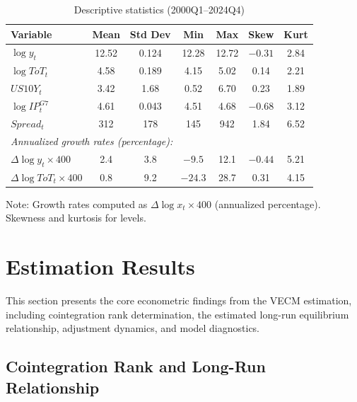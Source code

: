 \documentclass[12pt,a4paper]{article}
\numberwithin{equation}{section}
\theoremstyle{definition}
\theoremstyle{remark}
\begin{document}
\begin{table}[ht]
\centering
\begin{threeparttable}
\caption{Descriptive statistics (2000Q1--2024Q4)}
\label{tab:descriptives}
\begin{tabular}{@{}lcccccc@{}}
\toprule
\textbf{Variable} & \textbf{Mean} & \textbf{Std Dev} & \textbf{Min} & \textbf{Max} & \textbf{Skew} & \textbf{Kurt} \\
\midrule
$\log y_t$ & 12.52 & 0.124 & 12.28 & 12.72 & $-0.31$ & 2.84 \\
$\log ToT_t$ & 4.58 & 0.189 & 4.15 & 5.02 & 0.14 & 2.21 \\
$US10Y_t$ & 3.42 & 1.68 & 0.52 & 6.70 & 0.23 & 1.89 \\
$\log IP^{G7}_t$ & 4.61 & 0.043 & 4.51 & 4.68 & $-0.68$ & 3.12 \\
$Spread_t$ & 312 & 178 & 145 & 942 & 1.84 & 6.52 \\
\midrule
\multicolumn{7}{l}{\textit{Annualized growth rates (percentage):}} \\
$\Delta \log y_t \times 400$ & 2.4 & 3.8 & $-9.5$ & 12.1 & $-0.44$ & 5.21 \\
$\Delta \log ToT_t \times 400$ & 0.8 & 9.2 & $-24.3$ & 28.7 & 0.31 & 4.15 \\
\bottomrule
\end{tabular}
\begin{tablenotes}\footnotesize
\item Note: Growth rates computed as $\Delta \log x_t \times 400$ (annualized percentage). Skewness and kurtosis for levels.
\end{tablenotes}
\end{threeparttable}
\end{table}



\section{Estimation Results}
\label{sec:results}

This section presents the core econometric findings from the VECM estimation, including cointegration rank determination, the estimated long-run equilibrium relationship, adjustment dynamics, and model diagnostics.


\subsection{Cointegration Rank and Long-Run Relationship}
\end{document}
